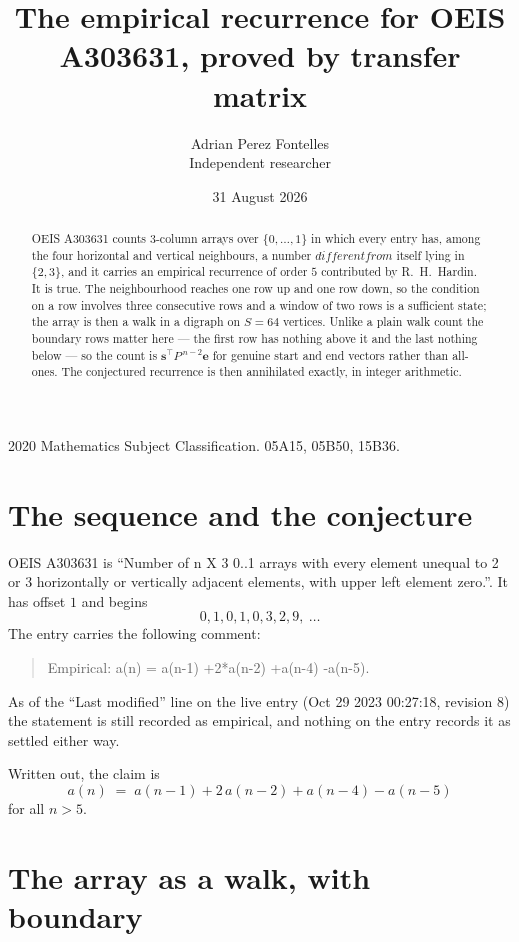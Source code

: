 \documentclass[11pt,a4paper]{article}
\title{The empirical recurrence for OEIS A303631, proved by transfer matrix}
\author{Adrian Perez Fontelles\\ \small Independent researcher}
\date{31 August 2026}
\theoremstyle{plain}
\theoremstyle{definition}
\begin{document}
\maketitle

\begin{abstract}
OEIS A303631 counts $3$-column arrays over $\{0,\dots,1\}$ in which every entry has,
among the four horizontal and vertical neighbours, a number $different from$ itself lying in $\{2,3\}$, and it carries an empirical
recurrence of order $5$ contributed by R.~H.~Hardin. It is true. The neighbourhood
reaches one row up and one row down, so the condition on a row involves three consecutive
rows and a window of two rows is a sufficient state; the array is then a walk in a digraph
on $S=64$ vertices. Unlike a plain walk count the boundary rows matter here --- the first
row has nothing above it and the last nothing below --- so the count is
$\mathbf{s}^{\!\top}P^{\,n-2}\mathbf{e}$ for genuine start and end vectors rather than
all-ones. The conjectured recurrence is then annihilated exactly, in integer arithmetic.
\end{abstract}

\noindent\small 2020 Mathematics Subject Classification. 05A15, 05B50, 15B36.\normalsize

\section{The sequence and the conjecture}

OEIS A303631 is ``Number of n X 3 0..1 arrays with every element unequal to 2 or 3 horizontally or vertically adjacent elements, with upper left element zero.''. It has offset
$1$ and begins
\[
0, 1, 0, 1, 0, 3, 2, 9,\ \dots
\]
The entry carries the following comment:
\begin{quote}\small
Empirical: a(n) = a(n-1) +2*a(n-2) +a(n-4) -a(n-5).
\end{quote}
As of the ``Last modified'' line on the live entry (Oct 29 2023 00:27:18, revision
8) the statement is still recorded as empirical, and nothing on the entry
records it as settled either way.

Written out, the claim is
\begin{equation}\label{eq:conj}
a(n)\;=\;a(n-1) + 2\,a(n-2) + a(n-4) - a(n-5)
\end{equation}
for all $n>5$.

\section{The array as a walk, with boundary}
\end{document}
